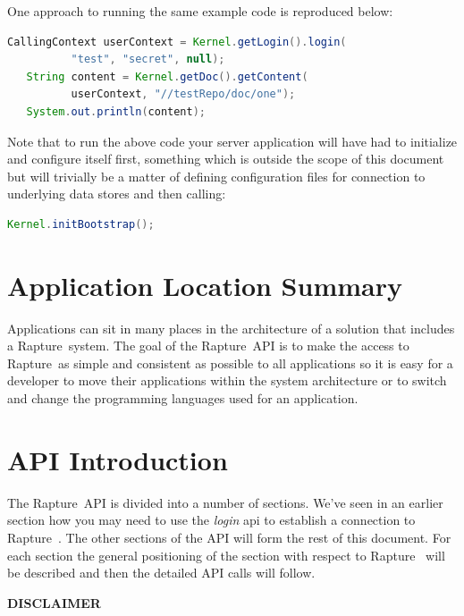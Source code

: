 \documentclass[12pt,twoside,a4paper]{article}
\newcommand{\Rapture}{Rapture~}
\begin{document}
One approach to running the same example code is reproduced below:

\begin{lstlisting}[caption={Kernel simple example}, language=Java]
   CallingContext userContext = Kernel.getLogin().login(
          "test", "secret", null);
   String content = Kernel.getDoc().getContent(
          userContext, "//testRepo/doc/one");
   System.out.println(content);
\end{lstlisting}

Note that to run the above code your server application will have had to initialize
and configure itself first, something which is outside the scope of this document
but will trivially be a matter of defining configuration files for connection to
underlying data stores and then calling:

\begin{lstlisting}[caption={Kernel initialization}, language=Java]
   Kernel.initBootstrap();
\end{lstlisting}

\section{Application Location Summary}
Applications can sit in many places in the architecture of a solution that
includes a \Rapture system. The goal of the \Rapture API is to make the access
to \Rapture as simple and consistent as possible to all applications so it is
easy for a developer to move their applications within the system architecture or
to switch and change the programming languages used for an application.

\section{API Introduction}
The \Rapture API is divided into a number of sections. We've seen in an earlier
section how you may need to use the \emph{login} api to establish a connection
to \Rapture. The other sections of the API will form the rest of this document.
For each section the general positioning of the section with respect to \Rapture
will be described and then the detailed API calls will follow.


\clearpage
\vspace*{10pt}

\begin{center} \textbf{DISCLAIMER} \end{center}
\end{document}
